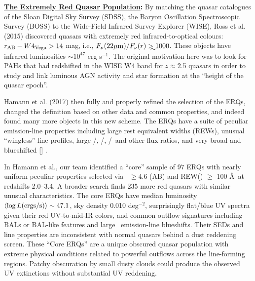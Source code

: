 \medskip
\medskip

\smallskip
\smallskip
\noindent
{\bf \underline{The Extremely Red Quasar Population}:}
By matching the quasar catalogues of the Sloan Digital Sky Survey
(SDSS), the Baryon Oscillation Spectroscopic Survey (BOSS) to the
Wide-Field Infrared Survey Explorer (WISE), Ross et al. (2015)
discovered quasars with extremely red infrared-to-optical colours:
$r_{\rm AB}-W4_{\rm Vega}>14$ mag, i.e., $F_\nu({\rm 22\mu
m})/F_\nu(r) \gtrsim 1000$.  These objects have infrared luminosities
$\sim 10^{47}$ erg s$^{-1}$.  The original motivation here was to look
for PAHs that had redshifted in the WISE W4 band for $z\approx$2.5
quasars in order to study and link luminous AGN activity and star
formation at the ``height of the quasar epoch''.

Hamann et al. (2017) then fully and properly refined the selection of
the ERQs, changed the definition based on other data and common
properties, and indeed found many more objects in this new scheme. The
ERQs have a suite of peculiar emission-line properties including large
rest equivalent widths (REWs), unusual ``wingless'' line profiles,
large \nv /\lya , \nv /\civ , \siiv /\civ\ and other flux ratios, and
very broad and blueshifted [\oiii ] .

In Hamann et al., our team identified a ``core'' sample of 97 ERQs
with nearly uniform peculiar properties selected via \imw\ $\ge 4.6$
(AB) and REW(\civ ) $\ge$ 100 \AA\ at redshifts 2.0--3.4. A broader
search finds 235 more red quasars with similar unusual
characteristics. The core ERQs have median luminosity $\left<\log L
({\rm ergs/s})\right> \sim 47.1$, sky density 0.010 deg$^{-2}$,
surprisingly flat/blue UV spectra given their red UV-to-mid-IR colors,
and common outflow signatures including BALs or BAL-like features and
large \civ\ emission-line blueshifts. Their SEDs and line properties
are inconsistent with normal quasars behind a dust reddening
screen. These ``Core ERQs'' are a unique obscured quasar population
with extreme physical conditions related to powerful outflows across
the line-forming regions. Patchy obscuration by small dusty clouds
could produce the observed UV extinctions without substantial UV
reddening.


